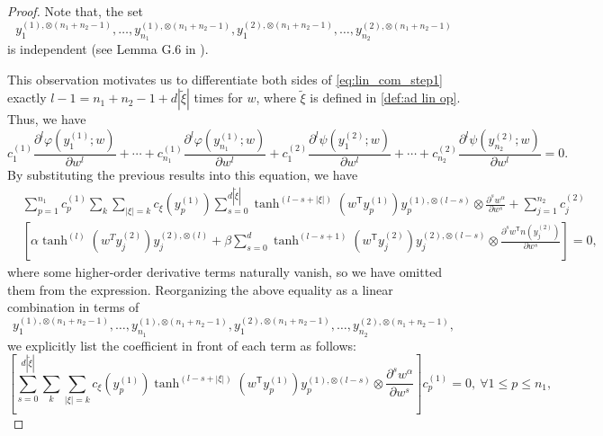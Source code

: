 \documentclass{article}
\newcommand{\T}{\mathsf{T}}
\begin{document}
\begin{proof}
Note that,  the set
\begin{equation*}
    y_1^{(1), \otimes (n_1 + n_2 - 1)}, \ldots, y_{n_1}^{(1), \otimes (n_1 + n_2 - 1)}, 
    y_1^{(2), \otimes (n_1 + n_2 - 1)}, \ldots, y_{n_2}^{(2), \otimes (n_1 + n_2 - 1)}
\end{equation*}
is independent (see Lemma G.6 in \cite{gd_cong2}). 

This observation motivates us to differentiate both sides of \cref{eq:lin_com_step1} exactly \( l-1=n_1 +n_2 -1 + d|\tilde{\xi}| \) times for \( w \), where $\tilde{\xi}$ is defined in \cref{def:ad lin op}. 
Thus, we have
\begin{equation*}
   c_1^{(1)} \frac{\partial^l \varphi(y_1^{(1)}; w)}{\partial w^l} + \cdots + c_{n_1}^{(1)} \frac{\partial^l \varphi(y_{n_1}^{(1)}; w)}{\partial w^l}
+ c_1^{(2)} \frac{\partial^l \psi(y_1^{(2)}; w)}{\partial w^l} + \cdots + c_{n_2}^{(2)}\frac{\partial^l \psi(y_{n_2}^{(2)}; w)}{\partial w^l}
= 0.
\end{equation*}
By substituting the previous results into this equation, we have
\begin{equation*}
    \begin{aligned}
   &\sum_{p=1}^{n_1}c_p^{(1)}\sum_{k}\sum_{|\xi|=k}c_{\xi}(y_p^{(1)})\sum_{s=0}^{d|\tilde{\xi}|}\tanh^{(l-s+|\xi|)}(w^\T y_p^{(1)})y_p^{(1),\otimes (l-s)}\otimes \frac{\partial^s w^\alpha}{\partial w^s}+\sum_{j=1}^{n_2}c_j^{(2)}\\
&  \left[\alpha \tanh^{(l)}(w^T y_j^{(2)}) y_j^{(2), \otimes (l)}+\beta \sum_{s=0}^{d}\tanh^{(l-s+1)}(w^\T y_j^{(2)})y_j^{(2), \otimes (l-s)}\otimes \frac{\partial^s w^\T n(y_j^{(2)})}{\partial w^s}\right]
= 0,
    \end{aligned}
\end{equation*}
where some higher-order derivative terms naturally vanish, so we have omitted them from the expression.
Reorganizing the above equality as a linear combination in terms of 
\begin{equation*}
    y_1^{(1), \otimes (n_1 + n_2 - 1)}, \ldots, y_{n_1}^{(1), \otimes (n_1 + n_2 - 1)}, 
    y_1^{(2), \otimes (n_1 + n_2 - 1)}, \ldots, y_{n_2}^{(2), \otimes (n_1 + n_2 - 1)},
\end{equation*}
we explicitly list the coefficient in front of each term as follows:
\begin{equation}
    \left[\sum_{s=0}^{d|\tilde{\xi}|}\sum_{k}\sum_{|\xi|=k}c_{\xi}(y_p^{(1)})\tanh^{(l-s+|\xi|)}(w^\T y_p^{(1)})y_p^{(1),\otimes (l-s)}\otimes \frac{\partial^s w^\alpha}{\partial w^s}\right]c_p^{(1)}=0 , \ \forall 1\le p\le n_1, \label{eq:c_1}

\end{equation}
\end{proof}
\end{document}
